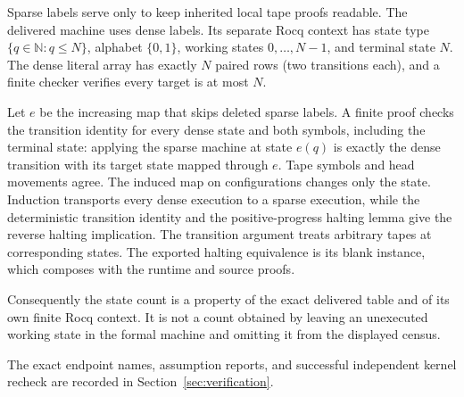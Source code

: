 Sparse labels serve only to keep inherited local tape proofs readable.
The delivered machine uses dense labels. Its separate Rocq context has
state type \(\{q\in\mathbb N:q\le N\}\), alphabet \(\{0,1\}\),
working states \(0,\ldots,N-1\), and terminal state \(N\).
The dense literal array has exactly \(N\) paired rows (two transitions each), and a finite checker
verifies every target is at most \(N\).

Let \(e\) be the increasing map that skips deleted sparse labels.
A finite proof checks the transition identity for every dense state and
both symbols, including the terminal state: applying the sparse machine
at state \(e(q)\) is exactly the dense transition with its target state
mapped through \(e\). Tape symbols and head movements agree. The induced
map on configurations changes only the state. Induction transports every
dense execution to a sparse execution, while the deterministic transition
identity and the positive-progress halting lemma give the reverse halting
implication. The transition argument treats arbitrary tapes at corresponding states.
The exported halting equivalence is its blank instance, which composes
with the runtime and source proofs.

Consequently the state count is a property of the exact delivered table
and of its own finite Rocq context. It is not a count obtained by leaving
an unexecuted working state in the formal machine and omitting it from
the displayed census.


The exact endpoint names, assumption reports, and successful independent
kernel recheck are recorded in Section~\ref{sec:verification}.
